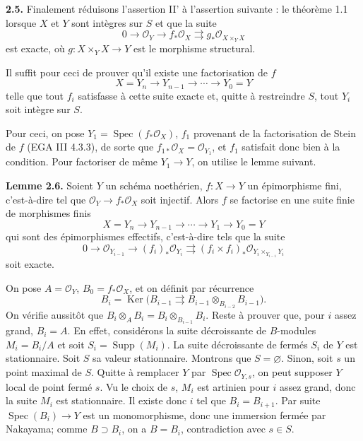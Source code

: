 \documentclass[11pt]{article}
\newcommand{\Spec}{\operatorname{Spec}}
\providecommand{\Ker}{\operatorname{Ker}}
\providecommand{\Supp}{\operatorname{Supp}}
\begin{document}
\textbf{2.5.} Finalement réduisons l'assertion II' à l'assertion suivante : le théorème 1.1 lorsque \(X\) et \(Y\) sont intègres sur \(S\) et que la suite
\[
  0\longrightarrow \mathcal O_Y
  \longrightarrow f_*\mathcal O_X
  \rightrightarrows g_*\mathcal O_{X\times_YX}
\]
est exacte, où \(g:X\times_YX\to Y\) est le morphisme structural.

Il suffit pour ceci de prouver qu'il existe une factorisation de \(f\)
\[
  X=Y_n\longrightarrow Y_{n-1}\longrightarrow\cdots\longrightarrow Y_0=Y
\]
telle que tout \(f_i\) satisfasse à cette suite exacte et, quitte à restreindre \(S\), tout \(Y_i\) soit intègre sur \(S\).

Pour ceci, on pose \(Y_1=\Spec(f_*\mathcal O_X)\), \(f_1\) provenant de la factorisation de Stein de \(f\) (EGA III 4.3.3), de sorte que \(f_{1*}\mathcal O_X=\mathcal O_{Y_1}\), et \(f_1\) satisfait donc bien à la condition. Pour factoriser de même \(Y_1\to Y\), on utilise le lemme suivant.

\textbf{Lemme 2.6.} Soient \(Y\) un schéma noethérien, \(f:X\to Y\) un épimorphisme fini, c'est-à-dire tel que \(\mathcal O_Y\to f_*\mathcal O_X\) soit injectif. Alors \(f\) se factorise en une suite finie de morphismes finis
\[
  X=Y_n\longrightarrow Y_{n-1}\longrightarrow\cdots\longrightarrow Y_1\longrightarrow Y_0=Y
\]
qui sont des épimorphismes effectifs, c'est-à-dire tels que la suite
\[
  0\longrightarrow \mathcal O_{Y_{i-1}}
  \longrightarrow (f_i)_*\mathcal O_{Y_i}
  \rightrightarrows
  (f_i\times f_i)_*\mathcal O_{Y_i\times_{Y_{i-1}}Y_i}
\]
soit exacte.

On pose \(A=\mathcal O_Y\), \(B_0=f_*\mathcal O_X\), et on définit par récurrence
\[
  B_i=\Ker\bigl(B_{i-1}\rightrightarrows B_{i-1}\otimes_{B_{i-2}}B_{i-1}\bigr).
\]
On vérifie aussitôt que \(B_i\otimes_A B_i=B_i\otimes_{B_{i-1}}B_i\). Reste à prouver que, pour \(i\) assez grand, \(B_i=A\). En effet, considérons la suite décroissante de \(B\)-modules \(M_i=B_i/A\) et soit \(S_i=\Supp(M_i)\). La suite décroissante de fermés \(S_i\) de \(Y\) est stationnaire. Soit \(S\) sa valeur stationnaire. Montrons que \(S=\varnothing\). Sinon, soit \(s\) un point maximal de \(S\). Quitte à remplacer \(Y\) par \(\Spec\mathcal O_{Y,s}\), on peut supposer \(Y\) local de point fermé \(s\). Vu le choix de \(s\), \(M_i\) est artinien pour \(i\) assez grand, donc la suite \(M_i\) est stationnaire. Il existe donc \(i\) tel que \(B_i=B_{i+1}\). Par suite \(\Spec(B_i)\to Y\) est un monomorphisme, donc une immersion fermée par Nakayama; comme \(B\supset B_i\), on a \(B=B_i\), contradiction avec \(s\in S\).
\end{document}
